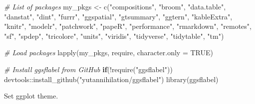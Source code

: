 \documentclass[
  12pt,
]{article}
\newenvironment{Shaded}{\begin{snugshade}}{\end{snugshade}}
\newcommand{\AttributeTok}[1]{\textcolor[rgb]{0.77,0.63,0.00}{#1}}
\newcommand{\CommentTok}[1]{\textcolor[rgb]{0.56,0.35,0.01}{\textit{#1}}}
\newcommand{\ConstantTok}[1]{\textcolor[rgb]{0.00,0.00,0.00}{#1}}
\newcommand{\ControlFlowTok}[1]{\textcolor[rgb]{0.13,0.29,0.53}{\textbf{#1}}}
\newcommand{\FunctionTok}[1]{\textcolor[rgb]{0.00,0.00,0.00}{#1}}
\newcommand{\NormalTok}[1]{#1}
\newcommand{\OtherTok}[1]{\textcolor[rgb]{0.56,0.35,0.01}{#1}}
\newcommand{\SpecialCharTok}[1]{\textcolor[rgb]{0.00,0.00,0.00}{#1}}
\newcommand{\StringTok}[1]{\textcolor[rgb]{0.31,0.60,0.02}{#1}}
\begin{document}
\begin{Shaded}
\begin{Highlighting}[]
\CommentTok{\# List of packages }
\NormalTok{my\_pkgs }\OtherTok{\textless{}{-}} \FunctionTok{c}\NormalTok{(}\StringTok{"compositions"}\NormalTok{, }
             \StringTok{"broom"}\NormalTok{,}
             \StringTok{"data.table"}\NormalTok{, }\StringTok{"danstat"}\NormalTok{, }\StringTok{"dint"}\NormalTok{,}
             \StringTok{"furrr"}\NormalTok{,}
             \StringTok{"ggspatial"}\NormalTok{, }\StringTok{"gtsummary"}\NormalTok{, }\StringTok{"ggtern"}\NormalTok{, }
             \StringTok{"kableExtra"}\NormalTok{, }\StringTok{"knitr"}\NormalTok{,}
             \StringTok{"modelr"}\NormalTok{,}
             \StringTok{"patchwork"}\NormalTok{, }\StringTok{"papeR"}\NormalTok{, }\StringTok{"performance"}\NormalTok{,  }
             \StringTok{"rmarkdown"}\NormalTok{, }\StringTok{"remotes"}\NormalTok{, }
             \StringTok{"sf"}\NormalTok{, }\StringTok{"spdep"}\NormalTok{,}
             \StringTok{"tricolore"}\NormalTok{,}
             \StringTok{"units"}\NormalTok{,}
             \StringTok{"viridis"}\NormalTok{,}
             \StringTok{"tidyverse"}\NormalTok{, }\StringTok{"tidytable"}\NormalTok{, }\StringTok{"tm"}\NormalTok{)}

\CommentTok{\# Load packages}
\FunctionTok{lapply}\NormalTok{(my\_pkgs, require, }\AttributeTok{character.only =} \ConstantTok{TRUE}\NormalTok{)}

\CommentTok{\# Install ggsflabel from GitHub}
\ControlFlowTok{if}\NormalTok{(}\SpecialCharTok{!}\FunctionTok{require}\NormalTok{(}\StringTok{"ggsflabel"}\NormalTok{)) devtools}\SpecialCharTok{::}\FunctionTok{install\_github}\NormalTok{(}\StringTok{"yutannihilation/ggsflabel"}\NormalTok{)}
\FunctionTok{library}\NormalTok{(ggsflabel)}
\end{Highlighting}
\end{Shaded}

Set ggplot theme.
\end{document}
